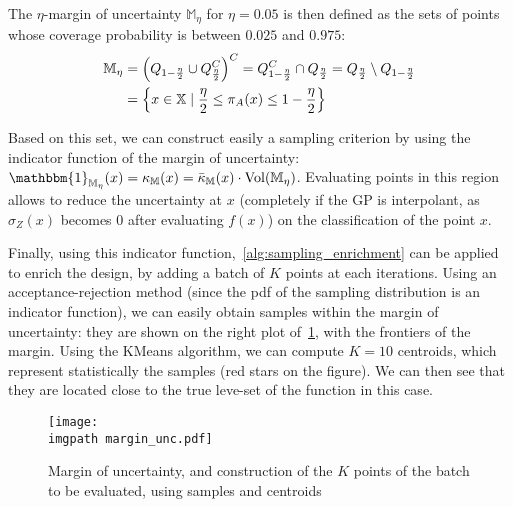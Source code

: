 \documentclass[../../Main_ManuscritThese.tex]{subfiles}
\newcommand\imgpath{/home/victor/acadwriting/Manuscrit/Text/Chapter4/img/}
\begin{document}
The $\eta$-margin of uncertainty $\mathbb{M}_{\eta}$ for $\eta=0.05$
is then defined as the sets of points whose coverage probability is
between $0.025$ and $0.975$:
\begin{align}
  \label{eq:margin_unc}
  \mathbb{M}_{\eta} &= \left(Q_{1-\frac{\eta}{2}} \cup Q^C_{\frac{\eta}{2}} \right)^C = Q_{1-\frac{\eta}{2}}^C \cap Q_{\frac{\eta}{2}} = Q_{\frac{\eta}{2}} \setminus Q_{1-\frac{\eta}{2}} \\
                    &= \left\{x \in \mathbb{X} \mid \frac{\eta}{2} \leq \pi_A(x) \leq 1 - \frac{\eta}{2} \right\}
\end{align}

Based on this set, we can construct easily a sampling criterion by
using the indicator function of the margin of uncertainty:
$\mathbbm{1}_{\mathbb{M}_{\eta}}(x)=\kappa_{\mathbb{M}}(x) =
\bar{\kappa}_{\mathbb{M}}(x) \cdot \mathrm{Vol}(\mathbb{M}_{\eta})$.
 Evaluating points in this region allows to reduce
the uncertainty at $x$ (completely if the GP is interpolant, as
$\sigma_Z(x)$ becomes $0$ after evaluating $f(x)$) on the
classification of the point $x$.

Finally, using this indicator function,~\cref{alg:sampling_enrichment}
can be applied to enrich the design, by adding a batch of $K$ points
at each iterations.  Using an acceptance-rejection method (since the
pdf of the sampling distribution is an indicator function), we can
easily obtain samples within the margin of uncertainty: they are shown
on the right plot of~\cref{fig:margin_unc}, with the frontiers of the
margin.  Using the KMeans algorithm, we can compute $K=\num{10}$
centroids, which represent statistically the samples (red stars on the
figure). We can then see that they are located close to the true
leve-set of the function in this case.

\begin{figure}[ht]
  \centering
  \texttt{[image: \\imgpath margin\_unc.pdf]}
  \caption[Samples in the margin of uncertainties and
  centroids]{\label{fig:margin_unc} Margin of uncertainty, and
    construction of the $K$ points of the batch to be evaluated, using
    samples and centroids}
\end{figure}

\end{document}
